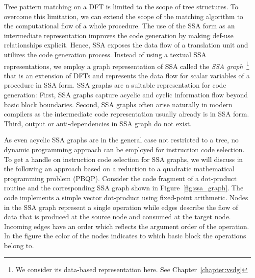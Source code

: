 Tree pattern matching on a DFT is limited to the scope of tree
structures.  To overcome this limitation, we can extend the scope of
the matching algorithm to the computational flow of a whole procedure.
The use of the SSA form as an intermediate
representation improves the code generation by making def-use
relationships explicit. Hence, SSA exposes the data flow of a
translation unit and utilizes the code generation process.  Instead of
using a textual SSA representations, we employ a graph representation
of SSA called the \emph{SSA graph}~\footnote{We consider its
  data-based representation here. See Chapter~\ref{chapter:vsdg}} that
is an extension of DFTs and represents the data flow for scalar
variables of a procedure in SSA form.  SSA graphs are a suitable
representation for code generation: First, SSA graphs capture acyclic
and cyclic information flow beyond basic block boundaries. Second, SSA
graphs often arise naturally in modern compilers as the intermediate
code representation usually already is in SSA form. Third, output or
anti-dependencies in SSA graph do not exist.

As even acyclic SSA graphs are in the general case not restricted to a tree, no dynamic programming approach
can be employed for instruction code selection.  To get a handle on instruction code
selection for SSA graphs, we will discuss in the following an approach
based on a reduction to a quadratic mathematical programming problem
(PBQP).  Consider the code fragment of a dot-product routine
and the corresponding SSA graph shown in Figure~\ref{fig:ssa_graph}.
The code implements a simple vector dot-product using fixed-point
arithmetic.  Nodes in the SSA graph represent a single
operation while edges describe the flow of data that is produced at the
source node and consumed at the target node. Incoming edges
have an order which reflects the argument order of the operation. In
the figure the color of the nodes indicates to which basic block the
operations belong to.

